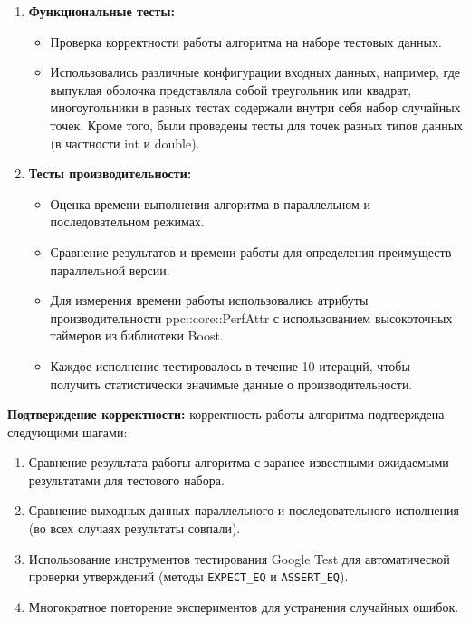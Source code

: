 \documentclass[a4paper,12pt]{article}
\begin{document}
\begin{enumerate}
\item\textbf{Функциональные тесты:}
\begin{itemize}
    \item Проверка корректности работы алгоритма на наборе тестовых данных. 
    \item Использовались различные конфигурации входных данных, например, где выпуклая оболочка представляла собой треугольник или квадрат, многоугольники в разных тестах содержали внутри себя набор случайных точек. Кроме того, были проведены тесты для точек разных типов данных (в частности int и double).

\end{itemize}

\item\textbf{Тесты производительности:}
\begin{itemize}
    \item Оценка времени выполнения алгоритма в параллельном и последовательном режимах.
    \item Сравнение результатов и времени работы для определения преимуществ параллельной версии.
    \item Для измерения времени работы использовались атрибуты производительности ppc::core::PerfAttr с использованием высокоточных таймеров из библиотеки Boost.
    \item Каждое исполнение тестировалось в течение 10 итераций, чтобы получить статистически значимые данные о производительности.
\end{itemize}
\end{enumerate}

\textbf{Подтверждение корректности:}
корректность работы алгоритма подтверждена следующими шагами:
\begin{enumerate}
    \item Сравнение результата работы алгоритма с заранее известными ожидаемыми результатами для тестового набора.
    \item Сравнение выходных данных параллельного и последовательного исполнения (во всех случаях результаты совпали).
    \item Использование инструментов тестирования Google Test для автоматической проверки утверждений (методы \texttt{EXPECT\_EQ} и \texttt{ASSERT\_EQ}).
    \item Многократное повторение экспериментов для устранения случайных ошибок.
\end{enumerate}
\end{document}
